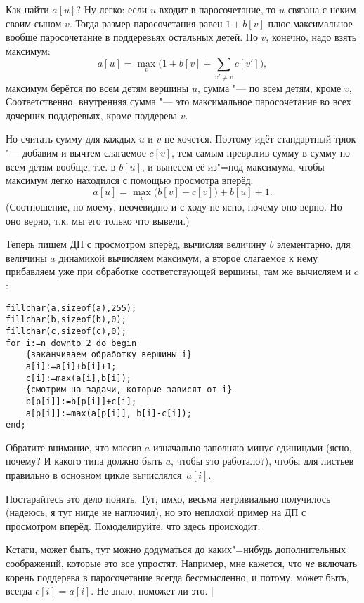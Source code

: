 Как найти $a[u]$? Ну легко: если $u$ входит в паросочетание, то $u$ связана с неким своим сыном 
$v$. Тогда размер паросочетания равен $1+b[v]$ плюс максимальное вообще паросочетание в поддеревьях 
остальных детей. По $v$, конечно, надо взять максимум:
$$
a[u]=\max_v \bigg(1+b[v]+\sum_{v'\neq v} c[v']\bigg),
$$
максимум берётся по всем детям вершины $u$, сумма "--- по всем детям, кроме $v$, 
Соответственно, внутренняя сумма "--- это максимальное паросочетание во всех дочерних поддеревьях, 
кроме поддерева $v$.

Но считать сумму для каждых $u$ и $v$ не хочется. Поэтому идёт стандартный трюк "--- добавим и 
вычтем слагаемое $c[v]$, тем самым превратив сумму в сумму по всем детям вообще, т.е. в $b[u]$, и 
вынесем её из"=под максимума, чтобы максимум легко находился с помощью просмотра вперёд:
$$
a[u]=\max_v \Big(b[v]-c[v]\Big)+b[u]+1.
$$
(Соотношение, по-моему, неочевидно и с ходу не ясно, почему оно верно. Но оно верно, т.к. мы его 
только что вывели.)

Теперь пишем ДП с просмотром вперёд, вычисляя величину $b$ элементарно, для величины $a$ динамикой 
вычисляем максимум, а второе слагаемое к нему прибавляем уже при обработке соответствующей вершины, там же вычисляем и $c$: 
\begin{codesampleo}\begin{verbatim}
fillchar(a,sizeof(a),255); 
fillchar(b,sizeof(b),0);
fillchar(c,sizeof(c),0);
for i:=n downto 2 do begin
    {заканчиваем обработку вершины i}
    a[i]:=a[i]+b[i]+1;
    c[i]:=max(a[i],b[i]);
    {смотрим на задачи, которые зависят от i}
    b[p[i]]:=b[p[i]]+c[i];
    a[p[i]]:=max(a[p[i]], b[i]-c[i]);
end;
\end{verbatim}
\end{codesampleo}
Обратите внимание, что массив $a$ изначально заполняю минус единицами (ясно, почему? И какого типа должно быть $a$, чтобы это работало?), чтобы для 
листьев правильно в основном цикле вычислялся~$a[i]$.

Постарайтесь это дело понять. Тут, имхо, весьма нетривиально получилось (надеюсь, я тут нигде не 
наглючил), но это неплохой пример на ДП с просмотром вперёд. Помоделируйте, что здесь происходит.

Кстати, может быть, тут можно додуматься до каких"=нибудь дополнительных соображений, которые это все 
упростят. Например, мне кажется, что \textit{не} включать корень поддерева в паросочетание всегда 
бессмысленно, и потому, может быть, всегда $c[i]=a[i]$. Не знаю, поможет ли это.
|

